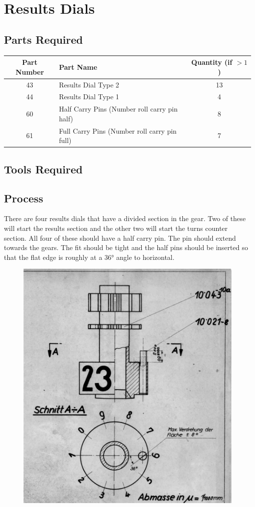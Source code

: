 \documentclass[openany]{book}
\begin{document}
\chapter{Results Dials}
\section{Parts Required}

\begin{table}[!ht]
	\centering
	\begin{tabular}{clc}
		Part Number & Part Name & Quantity (if $>1$) \\ \hline
		43 & Results Dial Type 2 & 13 \\
		44 & Results Dial Type 1 & 4 \\
		60 & Half Carry Pins (Number roll carry pin half) & 8\\
		61 & Full Carry Pins (Number roll carry pin full) & 7
	\end{tabular}
\end{table}

\section{Tools Required}

\section{Process}
There are four results dials that have a divided section in the gear. Two of these will start the results section and the other two will start the turns counter section. All four of these should have a half carry pin. The pin should extend towards the gears. The fit should be tight and the half pins should be inserted so that the flat edge is roughly at a 36° angle to horizontal.

\begin{figure}[!ht]
	\centering
	\includegraphics[width=.55\textwidth]{images/image46.png}
	\caption{}
	\label{fig:image46}	
\end{figure}
\end{document}
